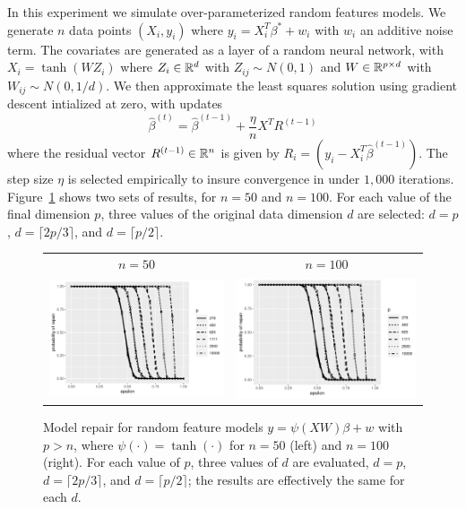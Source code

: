 In this experiment we simulate over-parameterized random features models.
We generate $n$ data points $(X_i, y_i)$ where
$y_i = X_i^T \beta^* + w_i$ with $w_i$ an additive noise term. The covariates are generated
as a layer of a random neural network, with $X_i = \tanh(WZ_i)$ where $Z_i \in\mathbb{R}^d$ with $Z_{ij} \sim N(0,1)$
and $W\in\mathbb{R}^{p\times d}$ with $W_{ij} \sim N(0, 1/d)$. We then approximate the least squares
solution using gradient descent intialized at zero, with updates
\begin{equation}
  \hat\beta^{(t)} = \hat\beta^{(t-1)} + \frac{\eta}{n} X^T R^{(t-1)}
\end{equation}
where the residual vector $R^{(t-1)}\in\mathbb{R}^n$ is given by $R_i = (y_i - X_i^ T\hat\beta^{(t-1)})$.
The step size $\eta$ is selected empirically to insure convergence in under $1{,}000$ iterations.
Figure~\ref{fig:rf} shows two sets of results, for $n=50$ and $n=100$. For each value of the final dimension $p$,
three values of the original data dimension $d$ are selected: $d=p$, $d=\lceil 2p/3\rceil$,
and $d=\lceil p/2\rceil$.

\begin{figure}[t]
  \begin{center}
    \begin{tabular}{cc}
      {\scriptsize $n=50$} & {\scriptsize $n=100$} \\
      \includegraphics[width=.47\textwidth]{fig/plot-rf-50} &
      \includegraphics[width=.47\textwidth]{fig/plot-rf-100}\\[-10pt]
    \end{tabular}
  \end{center}
\caption{Model repair for random feature models $y=\psi(XW)\beta + w$ with $p>n$, where $\psi(\cdot) = \tanh(\cdot)$
for $n=50$ (left) and $n=100$ (right). For each value of $p$, three values of $d$ are evaluated, $d=p$, $d=\lceil 2p/3\rceil$,
and $d=\lceil p/2\rceil$; the results are effectively the same for each $d$.}
\label{fig:rf}
\end{figure}
